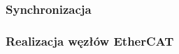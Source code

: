\subsubsection{Synchronizacja}


%
%
%

\subsubsection{Realizacja węzłów EtherCAT}

\subsubsection{}

